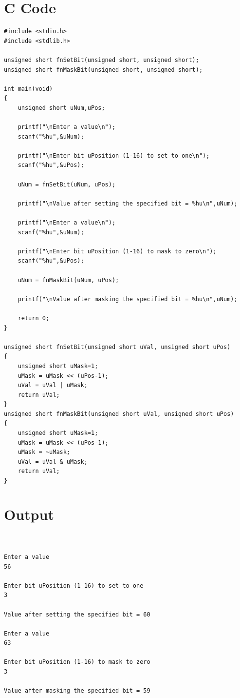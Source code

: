 \documentclass[a4paper]{report}
\begin{document}
\section*{C Code}
\begin{Verbatim}
#include <stdio.h>
#include <stdlib.h>

unsigned short fnSetBit(unsigned short, unsigned short);
unsigned short fnMaskBit(unsigned short, unsigned short);

int main(void)
{
	unsigned short uNum,uPos;

	printf("\nEnter a value\n");
	scanf("%hu",&uNum);

	printf("\nEnter bit uPosition (1-16) to set to one\n");
	scanf("%hu",&uPos);

	uNum = fnSetBit(uNum, uPos);

	printf("\nValue after setting the specified bit = %hu\n",uNum);

	printf("\nEnter a value\n");
	scanf("%hu",&uNum);

	printf("\nEnter bit uPosition (1-16) to mask to zero\n");
	scanf("%hu",&uPos);

	uNum = fnMaskBit(uNum, uPos);

	printf("\nValue after masking the specified bit = %hu\n",uNum);

	return 0;
}

unsigned short fnSetBit(unsigned short uVal, unsigned short uPos)
{
	unsigned short uMask=1;
	uMask = uMask << (uPos-1);
	uVal = uVal | uMask;
	return uVal;
}
unsigned short fnMaskBit(unsigned short uVal, unsigned short uPos)
{
	unsigned short uMask=1;
	uMask = uMask << (uPos-1);
	uMask = ~uMask;
	uVal = uVal & uMask;
	return uVal;
}
\end{Verbatim}
\section*{Output}
\begin{Verbatim}


Enter a value
56

Enter bit uPosition (1-16) to set to one
3

Value after setting the specified bit = 60

Enter a value
63

Enter bit uPosition (1-16) to mask to zero
3

Value after masking the specified bit = 59

\end{Verbatim}
\end{document}
